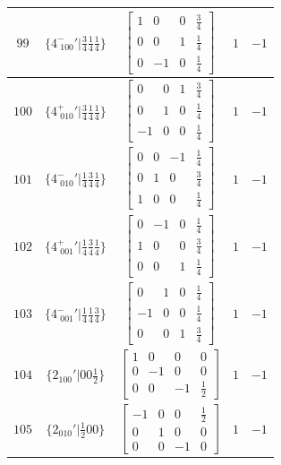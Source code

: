 \documentclass[fleqn,8pt]{jsarticle}
\begin{document}
\begin{longtable}{ccccc}
$ 99 $ & $ \{4^{-}_{\,\,100}{}'|\frac{3}{4} \frac{1}{4} \frac{1}{4}\} $ & $ \begin{bmatrix} 1 & 0 & 0 & \frac{3}{4} \\ 0 & 0 & 1 & \frac{1}{4} \\ 0 & -1 & 0 & \frac{1}{4} \end{bmatrix} $ & $ 1 $ & $ -1 $ \\ \hline
$ 100 $ & $ \{4^{+}_{\,\,010}{}'|\frac{3}{4} \frac{1}{4} \frac{1}{4}\} $ & $ \begin{bmatrix} 0 & 0 & 1 & \frac{3}{4} \\ 0 & 1 & 0 & \frac{1}{4} \\ -1 & 0 & 0 & \frac{1}{4} \end{bmatrix} $ & $ 1 $ & $ -1 $ \\ \hline
$ 101 $ & $ \{4^{-}_{\,\,010}{}'|\frac{1}{4} \frac{3}{4} \frac{1}{4}\} $ & $ \begin{bmatrix} 0 & 0 & -1 & \frac{1}{4} \\ 0 & 1 & 0 & \frac{3}{4} \\ 1 & 0 & 0 & \frac{1}{4} \end{bmatrix} $ & $ 1 $ & $ -1 $ \\ \hline
$ 102 $ & $ \{4^{+}_{\,\,001}{}'|\frac{1}{4} \frac{3}{4} \frac{1}{4}\} $ & $ \begin{bmatrix} 0 & -1 & 0 & \frac{1}{4} \\ 1 & 0 & 0 & \frac{3}{4} \\ 0 & 0 & 1 & \frac{1}{4} \end{bmatrix} $ & $ 1 $ & $ -1 $ \\ \hline
$ 103 $ & $ \{4^{-}_{\,\,001}{}'|\frac{1}{4} \frac{1}{4} \frac{3}{4}\} $ & $ \begin{bmatrix} 0 & 1 & 0 & \frac{1}{4} \\ -1 & 0 & 0 & \frac{1}{4} \\ 0 & 0 & 1 & \frac{3}{4} \end{bmatrix} $ & $ 1 $ & $ -1 $ \\ \hline
$ 104 $ & $ \{2{}_{100}{}'|0 0 \frac{1}{2}\} $ & $ \begin{bmatrix} 1 & 0 & 0 & 0 \\ 0 & -1 & 0 & 0 \\ 0 & 0 & -1 & \frac{1}{2} \end{bmatrix} $ & $ 1 $ & $ -1 $ \\ \hline
$ 105 $ & $ \{2{}_{010}{}'|\frac{1}{2} 0 0\} $ & $ \begin{bmatrix} -1 & 0 & 0 & \frac{1}{2} \\ 0 & 1 & 0 & 0 \\ 0 & 0 & -1 & 0 \end{bmatrix} $ & $ 1 $ & $ -1 $ \\ \hline

\end{longtable}
\end{document}
